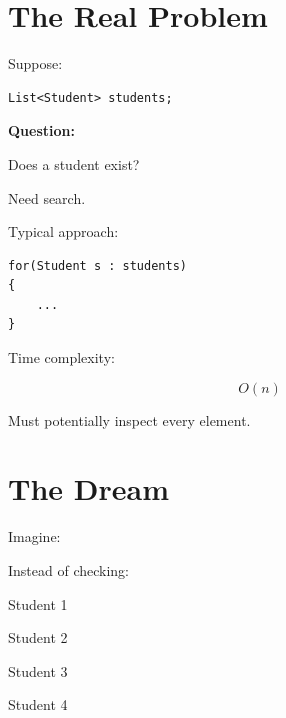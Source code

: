 \documentclass[11pt,a4paper]{book}
\begin{document}

\section{The Real Problem}

Suppose:

\begin{verbatim} 
List<Student> students;
\end{verbatim}


\textbf{Question:}


Does a student exist?


Need search.


Typical approach:

\begin{verbatim} 
for(Student s : students)
{
    ...
}
\end{verbatim}


Time complexity:

\[
O(n)
\]


Must potentially inspect
every element.


\section{The Dream}

Imagine:


Instead of checking:


Student 1

Student 2

Student 3

Student 4
\end{document}
